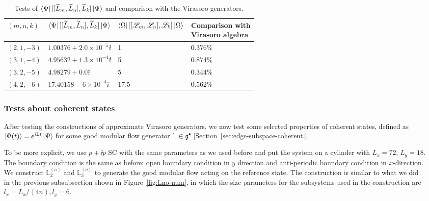 \documentclass[12pt, nofootinbib]{article}
\theoremstyle{plain}
\theoremstyle{assumption}
\theoremstyle{definition}
\theoremstyle{plain}
\theoremstyle{plain}
\theoremstyle{plain}
\theoremstyle{plain}
\theoremstyle{plain}
\def\Lb{\mathbb{L}}
\def\Lbo{\mathbb{L}^{(o)}}
\def\Leff{\widetilde{L}}
\def\Lcft{\mathscr{L}}
\def\gc{\mathfrak{g}^{\bullet}}
\begin{document}
\begin{table}[!h]
\begin{tabular}{|l|l|l|l|}
\hline
$(m,n,k)$ & $\bra{\Psi}[[\Leff_m, \Leff_n],\Leff_{k}]\ket{\Psi}$ & $\bra{\Omega}[[\Lcft_m, \Lcft_n],\Lcft_{k}]\ket{\Omega}$ & \makecell{ Comparison with \\ Virasoro algebra} \\ \hline
$(2,1,-3) $ & $1.00376+2.0\times   10^{-5} \ii$                      & 1                                                        & 0.376\%                                   \\ \hline
$(3,1,-4)$  & $4.95632+1.3\times   10^{-4} \ii$                      & 5                                                        & 0.874\%                                   \\ \hline
$(3,2,-5)$  & $4.98279   + 0.0 \ii$                                  & 5                                                        & 0.344\%                                   \\ \hline
$(4,2,-6)$  & $17.40158-6\times   10^{-4} \ii $                      & 17.5                                                     & 0.562\%                                   \\ \hline
\end{tabular}
\caption{Tests of $\bra{\Psi}[[\Leff_m, \Leff_n],\Leff_{k}]\ket{\Psi}$ and comparison with the Virasoro generators.}
\label{tab:Lmnk}
\end{table}

\subsubsection{Tests about coherent states}
\label{subsubsec:coherent-state-tests}

After testing the constructions of approximate Virasoro generators, we now test some selected properties of coherent states, defined as $\ket{\Psi(t)} = e^{i\Lb t} \ket{\Psi}$ for some good modular flow generator $\Lb\in\gc$ [Section~\ref{sec:edge-subspace-coherent}]. 

To be more explicit, we use $p+\ii p$ SC with the same parameters as we used before and put the system on a cylinder with $L_x = 72$, $L_y=18$. The boundary condition is the same as before: open boundary condition in $y$ direction and anti-periodic boundary condition in $x$-direction. We construct $\Lbo_2$ and $\Lbo_3$ to generate the good modular flow acting on the reference state. The construction is similar to what we did in the previous subsubsection shown in Figure~\ref{fig:Lno-num}, in which the size parameters for the subsystems used in the construction are $l_x = L_x/(4n),l_y = 6$. 
\end{document}
